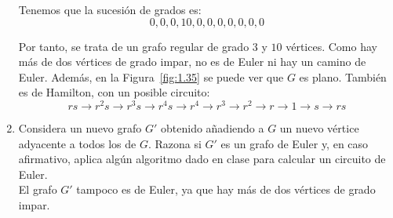 \begin{ejercicio}
\begin{enumerate}
        Tenemos que la sucesión de grados es:
        \begin{equation*}
            0, 0, 0, 10, 0, 0, 0, 0, 0, 0, 0
        \end{equation*}

        Por tanto, se trata de un grafo regular de grado $3$ y $10$ vértices. Como hay más de dos vértices de grado impar, no es de Euler ni hay un camino de Euler. Además, en la Figura~\ref{fig:1.35} se puede ver que $G$ es plano. También es de Hamilton, con un posible circuito:
        \begin{equation*}
            rs\to r^2s\to r^3s\to r^4s\to r^4\to r^3\to r^2\to r\to 1\to s\to rs
        \end{equation*}
        \item Considera un nuevo grafo $G'$ obtenido añadiendo a $G$ un nuevo vértice adyacente a todos los de $G$. Razona si $G'$ es un grafo de Euler y, en caso afirmativo, aplica algún algoritmo dado en clase para calcular un circuito de Euler.\\
        
        El grafo $G'$ tampoco es de Euler, ya que hay más de dos vértices de grado impar.
    \end{enumerate}
\end{ejercicio}

